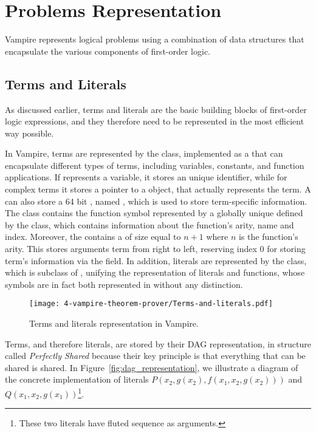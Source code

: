 \section{Problems Representation}\label{sec:problems-representation}

Vampire represents logical problems using a combination of data structures that encapsulate the various components of first-order logic.

\subsection{Terms and Literals}\label{subsec:terms-and-literals}

As discussed earlier, terms and literals are the basic building blocks of first-order logic expressions, and they therefore need to be represented in the most efficient way possible.

In Vampire, terms are represented by the  class, implemented as a  that can encapsulate different types of terms, including variables, constants, and function applications.
If  represents a variable, it stores an  unique identifier, while for complex terms it stores a pointer to a  object, that actually represents the term.
A  can also store a 64 bit , named , which is used to store term-specific information.
The  class contains the function symbol represented by a globally unique  defined by the  class, which contains information about the function's arity, name and index.
Moreover, the  contains a  of size equal to \(n+1\) where \(n\) is the function's arity.
This  stores arguments term from right to left, reserving index \(0\) for storing term's information via the  field.
In addition, literals are represented by the  class, which is subclass of , unifying the representation of literals and functions, whose symbols are in fact both represented in  without any distinction.

\begin{figure}[H]
  \centering
  \texttt{[image: 4-vampire-theorem-prover/Terms-and-literals.pdf]}
  \caption{Terms and literals representation in Vampire.}\label{fig:terms-representation}
\end{figure}

Terms, and therefore literals, are stored by their DAG representation, in structure called \emph{Perfectly Shared} because their key principle is that everything that can be shared is shared.
In Figure~\ref{fig:dag_representation}, we illustrate a diagram of the concrete implementation of literals \(P(x_2,g(x_2),f(x_1,x_2,g(x_2)))\) and \(Q(x_1,x_2,g(x_1))\)\footnote{
  These two literals have fluted sequence as arguments.
}.

